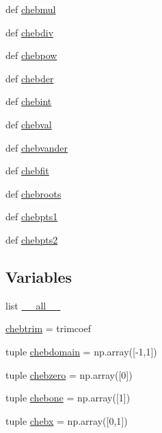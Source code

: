 \begin{DoxyCompactItemize}
\item 
def \hyperlink{namespacepyneb_1_1utils_1_1chebyshev_a20beb101adf242958f21dff04591e1ca}{chebmul}
\item 
def \hyperlink{namespacepyneb_1_1utils_1_1chebyshev_a5d4faaef412d6dfe502716e8e287d727}{chebdiv}
\item 
def \hyperlink{namespacepyneb_1_1utils_1_1chebyshev_ab647ff3aa7750a09b934b98cddd4c90d}{chebpow}
\item 
def \hyperlink{namespacepyneb_1_1utils_1_1chebyshev_a1ed2b9248c247449584904025ec9d460}{chebder}
\item 
def \hyperlink{namespacepyneb_1_1utils_1_1chebyshev_a233e686a07b9935c74ce1e053f0c5f5f}{chebint}
\item 
def \hyperlink{namespacepyneb_1_1utils_1_1chebyshev_a44ae40c5b4cbdc3a230c014c834f5ce6}{chebval}
\item 
def \hyperlink{namespacepyneb_1_1utils_1_1chebyshev_a4a53ad781fcf149c5ab6ae5d021b0950}{chebvander}
\item 
def \hyperlink{namespacepyneb_1_1utils_1_1chebyshev_a6bb5eb95525fd0572aea52fcd2a12c6c}{chebfit}
\item 
def \hyperlink{namespacepyneb_1_1utils_1_1chebyshev_a63ef136648aeceebc5b0a0cfce98d49a}{chebroots}
\item 
def \hyperlink{namespacepyneb_1_1utils_1_1chebyshev_aa5e7d5d318e547f5df15b55224524753}{chebpts1}
\item 
def \hyperlink{namespacepyneb_1_1utils_1_1chebyshev_a375236ee9f8b4a3f0d7d099af19e7818}{chebpts2}
\end{DoxyCompactItemize}
\subsection*{Variables}
\begin{DoxyCompactItemize}
\item 
list \hyperlink{namespacepyneb_1_1utils_1_1chebyshev_a9cb4e1ba55fc61d6dd46d5c6f534edbc}{\-\_\-\-\_\-all\-\_\-\-\_\-}
\item 
\hyperlink{namespacepyneb_1_1utils_1_1chebyshev_a66b8c25023851573f25dc418071de82b}{chebtrim} = trimcoef
\item 
tuple \hyperlink{namespacepyneb_1_1utils_1_1chebyshev_a57e110567544748d0de429d3743d1241}{chebdomain} = np.\-array(\mbox{[}-\/1,1\mbox{]})
\item 
tuple \hyperlink{namespacepyneb_1_1utils_1_1chebyshev_ad707fa9ec865920c2d8eedf6dfedf21c}{chebzero} = np.\-array(\mbox{[}0\mbox{]})
\item 
tuple \hyperlink{namespacepyneb_1_1utils_1_1chebyshev_a26a6cedd505a161858435461e1645503}{chebone} = np.\-array(\mbox{[}1\mbox{]})
\item 
tuple \hyperlink{namespacepyneb_1_1utils_1_1chebyshev_a00f984b78341cd7920c46d1a6acacc5f}{chebx} = np.\-array(\mbox{[}0,1\mbox{]})
\end{DoxyCompactItemize}



